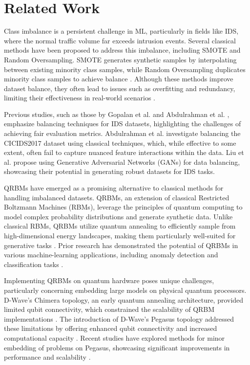\section{Related Work}
\label{sec:related}
Class imbalance is a persistent challenge in ML, particularly in fields like IDS, where the normal traffic volume far exceeds intrusion events. Several classical methods have been proposed to address this imbalance, including SMOTE and Random Oversampling. SMOTE generates synthetic samples by interpolating between existing minority class samples, while Random Oversampling duplicates minority class samples to achieve balance \cite{chawla2002smote, he2008learning}. Although these methods improve dataset balance, they often lead to issues such as overfitting and redundancy, limiting their effectiveness in real-world scenarios \cite{garcia2012effectiveness} \cite{mohammed2020machine}.

Previous studies, such as those by Gopalan et al. \cite{gopalan2021balancing} and Abdulrahman et al. \cite{abdulrahman2020toward}, emphasize balancing techniques for IDS datasets, highlighting the challenges of achieving fair evaluation metrics. Abdulrahman et al. \cite{abdulrahman2020toward} investigate balancing the CICIDS2017 dataset using classical techniques, which, while effective to some extent, often fail to capture nuanced feature interactions within the data. Liu et al. \cite{liu2022data} propose using Generative Adversarial Networks (GANs) for data balancing, showcasing their potential in generating robust datasets for IDS tasks. 

QRBMs have emerged as a promising alternative to classical methods for handling imbalanced datasets. QRBMs, an extension of classical Restricted Boltzmann Machines (RBMs), leverage the principles of quantum computing to model complex probability distributions and generate synthetic data. Unlike classical RBMs, QRBMs utilize quantum annealing to efficiently sample from high-dimensional energy landscapes, making them particularly well-suited for generative tasks \cite{hinton2006reducing, amin2018quantum}. Prior research has demonstrated the potential of QRBMs in various machine-learning applications, including anomaly detection and classification tasks  \cite{amin2018quantum, dixit2023quantum}.

Implementing QRBMs on quantum hardware poses unique challenges, particularly concerning embedding large models on physical quantum processors. D-Wave’s Chimera topology, an early quantum annealing architecture, provided limited qubit connectivity, which constrained the scalability of QRBM implementations \cite{venturelli2015quantum}. The introduction of D-Wave’s Pegasus topology addressed these limitations by offering enhanced qubit connectivity and increased computational capacity \cite{dwave2020pegasus}. Recent studies have explored methods for minor embedding of problems on Pegasus, showcasing significant improvements in performance and scalability \cite{dattani2019pegasus,pelofske2023clique}.

